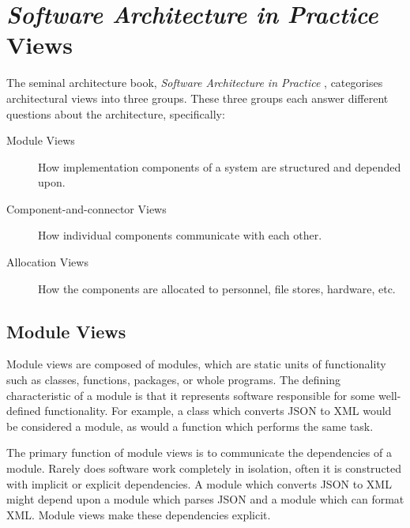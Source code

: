 \section{\textit{Software Architecture in Practice} Views}
The seminal architecture book, \textit{Software Architecture in Practice} \cite{bass2021software},
categorises architectural views into three groups.
These three groups each answer different questions about the architecture, specifically:
\begin{description}
    \item[Module Views] How implementation components of a system are structured and depended upon.
    \item[Component-and-connector Views] How individual components communicate with each other.
    \item[Allocation Views] How the components are allocated to personnel, file stores, hardware, etc.
\end{description}

\subsection{Module Views}
Module views are composed of modules, which are static units of functionality such as classes, functions, packages, or whole programs.
The defining characteristic of a module is that it represents software responsible for some well-defined functionality.
For example, a class which converts JSON to XML would be considered a module, as would a function which performs the same task.

The primary function of module views is to communicate the dependencies of a module.
Rarely does software work completely in isolation, often it is constructed with implicit or explicit dependencies.
A module which converts JSON to XML might depend upon a module which parses JSON and a module which can format XML.
Module views make these dependencies explicit.

